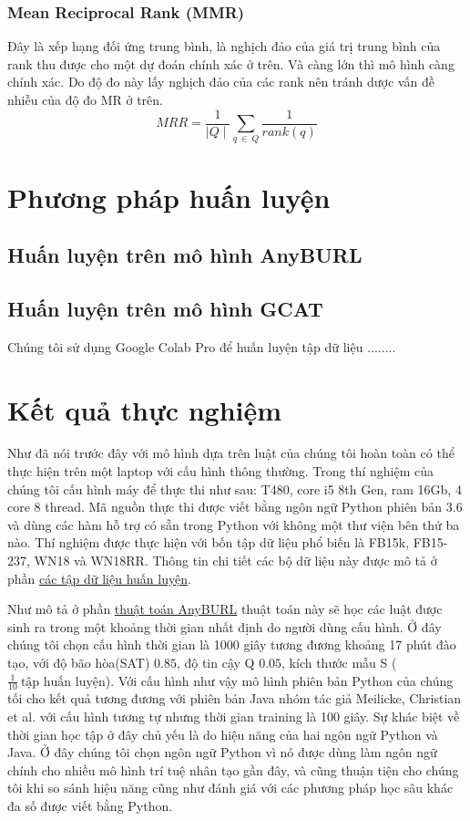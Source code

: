 \subsubsection{Mean Reciprocal Rank (MMR)}

Đây là xếp hạng đối ứng trung bình, là nghịch đảo của giá trị trung bình của rank thu được cho một dự đoán chính xác ở trên. Và càng lớn thì mô hình càng chính xác. Do độ đo này lấy nghịch đảo của các rank nên tránh dược vấn đề nhiễu của độ đo MR ở trên.
\[MRR =\frac{1}{\mid Q \mid} \sum_{q~ \in ~Q} \frac{1}{rank(q)}\]

\section{Phương pháp huấn luyện}

\subsection{Huấn luyện trên mô hình AnyBURL}


\subsection{Huấn luyện trên mô hình GCAT}

Chúng tôi sử dụng Google Colab Pro để huấn luyện tập dữ liệu
........

\section{Kết quả thực nghiệm}
\label{sec:Experiment}

Như đã nói trước đây với mô hình dựa trên luật của chúng tôi hoàn toàn có thể thực hiện trên một laptop với cấu hình thông thường. Trong thí nghiệm của chúng tôi cấu hình máy để thực thi như sau: T480, core i5 8th Gen, ram 16Gb, 4 core 8 thread. Mã nguồn thực thi được viết bằng ngôn ngữ Python phiên bản 3.6 và dùng các hàm hỗ trợ có sẵn trong Python với không một thư viện bên thứ ba nào. Thí nghiệm được thực hiện với bốn tập dữ liệu phổ biến là FB15k, FB15-237, WN18 và WN18RR. Thông tin chi tiết các bộ dữ liệu này được mô tả ở phần \hyperref[datasets]{các tập dữ liệu huấn luyện}.

Như mô tả ở phần \hyperref[algorithm2]{thuật toán AnyBURL} thuật toán này sẽ học các luật được sinh ra trong một khoảng thời gian nhất định do người dùng cấu hình. Ở đây chúng tôi chọn cấu hình thời gian là 1000 giây tương đương khoảng 17 phút đào tạo, với độ bão hòa(SAT) \(0.85\), độ tin cậy Q \(0.05\), kích thước mẫu S (\(\frac{1}{10}~ \text{tập huấn luyện}\)). Với cấu hình như vậy mô hình phiên bản Python của chúng tối cho kết quả tương đương với phiên bản Java nhóm tác giả Meilicke, Christian et al. \cite{burl} với cấu hình tương tự nhưng thời gian training là 100 giây. Sự khác biệt về thời gian học tập ở đây chủ yếu là do hiệu năng của hai ngôn ngữ Python và Java. Ở đây chúng tôi chọn ngôn ngữ Python vì nó được dùng làm ngôn ngữ chính cho nhiều mô hình trí tuệ nhân tạo gần đây, và cũng thuận tiện cho chúng tôi khi so sánh hiệu năng cũng như đánh giá với các phương pháp học sâu khác đa số được viết bằng Python.

